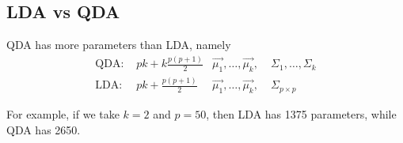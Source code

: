 
    \subsection{LDA vs QDA}
      QDA has more parameters than LDA, namely
      \begin{align*}
        \text{QDA: } & pk + k\frac{p(p+1)}{2} 
        &\vec{\mu_1},\dots,\vec{\mu_k},&\;\Sigma_1,\dots,\Sigma_k\\
        \text{LDA: } & pk + \frac{p(p+1)}{2}
        &\vec{\mu_1},\dots,\vec{\mu_k},&\;\Sigma_{p\times p}
      \end{align*}

      For example, if we take $k=2$ and $p=50$, then LDA has 1375 parameters, while QDA has 2650.
